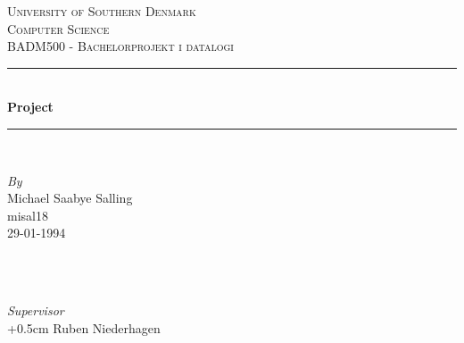 \documentclass[12pt]{article}
\begin{document}
\setlength{\baselineskip}{1.5\baselineskip} %

\begin{titlepage} %
	\newcommand{\HRule}{\rule{\linewidth}{0.5mm}} %
	
	\center %
	
	
	\textsc{\LARGE University of Southern Denmark}\\[1.5cm] %
	
	\textsc{\Large Computer Science}\\[0.5cm] %
	
	\textsc{\large BADM500 - Bachelorprojekt i datalogi}\\[0.5cm] %
	
	
	\HRule\\[0.4cm]
	
	{\huge\bfseries Project }\\[0.3cm] %
	
	\HRule\\[1.5cm]
	
	
	\begin{minipage}[c]{0.5\textwidth}
		\begin{flushleft}
			\large
			\textit{By}\\
			[5mm]
			{Michael Saabye Salling \\}
			{misal18}\\
			{29-01-1994}\\
			\textsc{\Large }\\
			\end{flushleft}
	\end{minipage}
	~
    \begin{minipage}{0.4\textwidth}
		\begin{flushright}
		\large
  		\kern-1.78cm
  		 \raggedleft
  		\textit{Supervisor}\\
  		\kern+0.5cm
		Ruben Niederhagen\\
		\end{flushright}
	\end{minipage}\\
	[6cm]
	

\end{titlepage}
\end{document}
